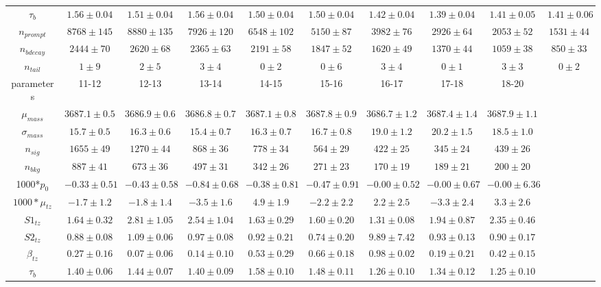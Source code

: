 \begin{sidewaystable}[h]
\begin{center}
{\begin{tabular}{c|ccccccccc}
$\tau_{b}$  & $1.56\pm0.04$ & $1.51\pm0.04$ & $1.56\pm0.04$ & $1.50\pm0.04$ & $1.50\pm0.04$ & $1.42\pm0.04$ & $1.39\pm0.04$ & $1.41\pm0.05$ & $1.41\pm0.06$\\
$n_{prompt}$  & $8768\pm145$ & $8880\pm135$ & $7926\pm120$ & $6548\pm102$ & $5150\pm87$ & $3982\pm76$ & $2926\pm64$ & $2053\pm52$ & $1531\pm44$\\
$n_{bdecay}$  & $2444\pm70$ & $2620\pm68$ & $2365\pm63$ & $2191\pm58$ & $1847\pm52$ & $1620\pm49$ & $1370\pm44$ & $1059\pm38$ & $850\pm33$\\
$n_{tail}$  & $1\pm9$ & $2\pm5$ & $3\pm4$ & $0\pm2$ & $0\pm6$ & $3\pm4$ & $0\pm1$ & $3\pm3$ & $0\pm2$\\
\hline
parameters & 11-12 & 12-13 & 13-14  &  14-15 & 15-16 & 16-17 & 17-18 & 18-20 \\ \hline
$\mu_{mass}$  & $3687.1\pm0.5$ & $3686.9\pm0.6$ & $3686.8\pm0.7$ & $3687.1\pm0.8$ & $3687.8\pm0.9$ & $3686.7\pm1.2$ & $3687.4\pm1.4$ & $3687.9\pm1.1$\\
$\sigma_{mass}$  & $15.7\pm0.5$ & $16.3\pm0.6$ & $15.4\pm0.7$ & $16.3\pm0.7$ & $16.7\pm0.8$ & $19.0\pm1.2$ & $20.2\pm1.5$ & $18.5\pm1.0$\\
$n_{sig}$  & $1655\pm49$ & $1270\pm44$ & $868\pm36$ & $778\pm34$ & $564\pm29$ & $422\pm25$ & $345\pm24$ & $439\pm26$\\
$n_{bkg}$  & $887\pm41$ & $673\pm36$ & $497\pm31$ & $342\pm26$ & $271\pm23$ & $170\pm19$ & $189\pm21$ & $200\pm20$\\
1000*$p_{0}$  & $-0.33\pm0.51$ & $-0.43\pm0.58$ & $-0.84\pm0.68$ & $-0.38\pm0.81$ & $-0.47\pm0.91$ & $-0.00\pm0.52$ & $-0.00\pm0.67$ & $-0.00\pm6.36$\\
$1000*\mu_{tz}$  & $-1.7\pm1.2$ & $-1.8\pm1.4$ & $-3.5\pm1.6$ & $4.9\pm1.9$ & $-2.2\pm2.2$ & $2.2\pm2.5$ & $-3.3\pm2.4$ & $3.3\pm2.6$\\
$S1_{tz}$  & $1.64\pm0.32$ & $2.81\pm1.05$ & $2.54\pm1.04$ & $1.63\pm0.29$ & $1.60\pm0.20$ & $1.31\pm0.08$ & $1.94\pm0.87$ & $2.35\pm0.46$\\
$S2_{tz}$  & $0.88\pm0.08$ & $1.09\pm0.06$ & $0.97\pm0.08$ & $0.92\pm0.21$ & $0.74\pm0.20$ & $9.89\pm7.42$ & $0.93\pm0.13$ & $0.90\pm0.17$\\
$\beta_{tz}$  & $0.27\pm0.16$ & $0.07\pm0.06$ & $0.14\pm0.10$ & $0.53\pm0.29$ & $0.66\pm0.18$ & $0.98\pm0.02$ & $0.19\pm0.21$ & $0.42\pm0.15$\\
$\tau_{b}$  & $1.40\pm0.06$ & $1.44\pm0.07$ & $1.40\pm0.09$ & $1.58\pm0.10$ & $1.48\pm0.11$ & $1.26\pm0.10$ & $1.34\pm0.12$ & $1.25\pm0.10$\\

\end{tabular}}
\end{center}
\end{sidewaystable}
